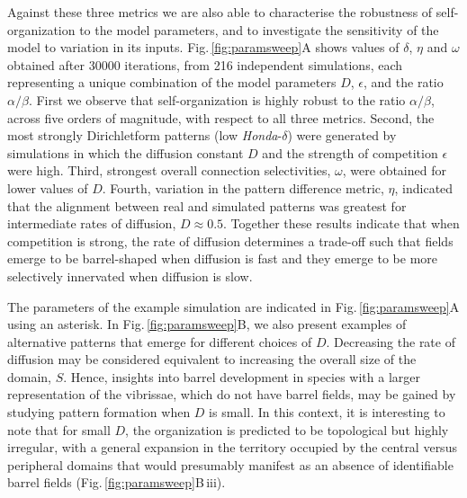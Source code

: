 \documentclass[9pt,lineno]{elife}
\newcommand{\MPthreePar}[1]{\textcolor{colmpthreepar}{#1}}
\newcommand{\metrics}[1]{\textcolor{colmetrics}{#1}}
\begin{document}
\metrics{Against these three metrics we are also able to characterise the
  robustness of self-organization to the model parameters, and to investigate
  the sensitivity of the model to variation in its inputs.} \MPthreePar{Fig.\,\ref{fig:paramsweep}A shows values of $\delta$, $\eta$ and
  $\omega$ obtained after 30000 iterations, from 216 independent simulations,
  each representing a unique combination of the model parameters $D$,
  $\epsilon$, and the ratio $\alpha/\beta$. First we observe that
  self-organization is highly robust to the ratio $\alpha/\beta$, across five
  orders of magnitude, with respect to all three metrics. Second, the most
  strongly Dirichletform patterns (low \emph{Honda}-$\delta$) were generated
  by simulations in which the diffusion constant $D$ and the strength of
  competition $\epsilon$ were high. Third, strongest overall connection selectivities,
  $\omega$, were obtained for lower values of $D$. Fourth, variation in the
  pattern difference metric, $\eta$, indicated that the alignment between real
  and simulated patterns was greatest for intermediate rates of diffusion,
  $D\approx0.5$. Together these results indicate that when competition is
  strong, the rate of diffusion determines a trade-off such that fields emerge
  to be barrel-shaped when diffusion is fast and they emerge to be more
  selectively innervated when diffusion is slow.}

\MPthreePar{The parameters of the example simulation are indicated in
  Fig.\,\ref{fig:paramsweep}A using an asterisk. In
  Fig.\,\ref{fig:paramsweep}B, we also present examples of alternative
  patterns that emerge for different choices of $D$. Decreasing the rate of
  diffusion may be considered equivalent to increasing the overall size of the
  domain, $S$. Hence, insights into barrel development in species with a
  larger representation of the vibrissae, which do not have barrel fields, may
  be gained by studying pattern formation
  when $D$ is small. In this context, it is interesting to note that for small
  $D$, the organization is predicted to be topological but highly irregular,
  with a general expansion in the territory occupied by the central versus
  peripheral domains that would presumably manifest as an absence of
  identifiable barrel fields (Fig.\,\ref{fig:paramsweep}B\,iii).}
\end{document}
